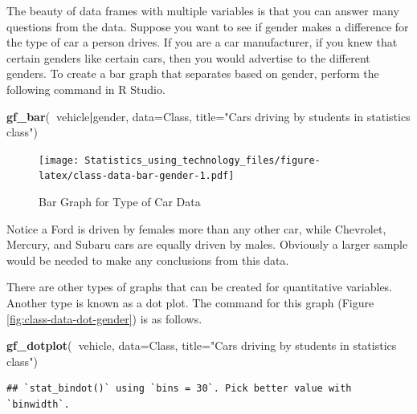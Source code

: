 \documentclass[
]{book}
\newenvironment{Shaded}{\begin{snugshade}}{\end{snugshade}}
\newcommand{\DataTypeTok}[1]{\textcolor[rgb]{0.13,0.29,0.53}{#1}}
\newcommand{\KeywordTok}[1]{\textcolor[rgb]{0.13,0.29,0.53}{\textbf{#1}}}
\newcommand{\NormalTok}[1]{#1}
\newcommand{\OperatorTok}[1]{\textcolor[rgb]{0.81,0.36,0.00}{\textbf{#1}}}
\newcommand{\StringTok}[1]{\textcolor[rgb]{0.31,0.60,0.02}{#1}}
\begin{document}
The beauty of data frames with multiple variables is that you can answer many questions from the data. Suppose you want to see if gender makes a difference for the type of car a person drives. If you are a car manufacturer, if you knew that certain genders like certain cars, then you would advertise to the different genders. To create a bar graph that separates based on gender, perform the following command in R Studio.



\begin{Shaded}
\begin{Highlighting}[]
\KeywordTok{gf_bar}\NormalTok{(}\OperatorTok{~}\NormalTok{vehicle}\OperatorTok{|}\NormalTok{gender, }\DataTypeTok{data=}\NormalTok{Class, }\DataTypeTok{title=}\StringTok{"Cars driving by students }
\StringTok{       in statistics class"}\NormalTok{)}
\end{Highlighting}
\end{Shaded}

\begin{figure}
\centering
\texttt{[image: Statistics\_using\_technology\_files/figure-latex/class-data-bar-gender-1.pdf]}
\caption{\label{fig:class-data-bar-gender}Bar Graph for Type of Car Data}
\end{figure}

Notice a Ford is driven by females more than any other car, while Chevrolet, Mercury, and Subaru cars are equally driven by males. Obviously a larger sample would be needed to make any conclusions from this data.

There are other types of graphs that can be created for quantitative variables. Another type is known as a dot plot. The command for this graph (Figure \ref{fig:class-data-dot-gender}) is as follows.



\begin{Shaded}
\begin{Highlighting}[]
\KeywordTok{gf_dotplot}\NormalTok{(}\OperatorTok{~}\NormalTok{vehicle, }\DataTypeTok{data=}\NormalTok{Class, }\DataTypeTok{title=}\StringTok{"Cars driving by students }
\StringTok{           in statistics class"}\NormalTok{)}
\end{Highlighting}
\end{Shaded}

\begin{verbatim}
## `stat_bindot()` using `bins = 30`. Pick better value with `binwidth`.
\end{verbatim}
\end{document}
